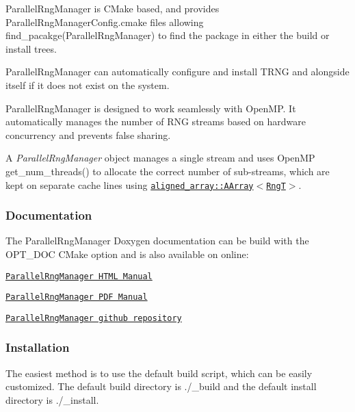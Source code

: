 \begin{DoxyItemize}
\item {\ttfamily Parallel\+Rng\+Manager} is C\+Make based, and provides {\ttfamily Parallel\+Rng\+Manager\+Config.\+cmake} files allowing {\ttfamily find\+\_\+pacakge(\+Parallel\+Rng\+Manager)} to find the package in either the build or install trees.
\item {\ttfamily Parallel\+Rng\+Manager} can automatically configure and install T\+R\+NG and alongside itself if it does not exist on the system.
\item {\ttfamily Parallel\+Rng\+Manager} is designed to work seamlessly with Open\+MP. It automatically manages the number of R\+NG streams based on hardware concurrency and prevents false sharing.
\item A {\itshape Parallel\+Rng\+Manager} object manages a single stream and uses Open\+MP {\ttfamily get\+\_\+num\+\_\+threads()} to allocate the correct number of sub-\/streams, which are kept on separate cache lines using \href{https://github.com/markjolah/AlignedArray}{\tt {\ttfamily aligned\+\_\+array\+::\+A\+Array$<$RngT$>$}}.
\end{DoxyItemize}

\subsubsection*{Documentation}

The Parallel\+Rng\+Manager Doxygen documentation can be build with the {\ttfamily O\+P\+T\+\_\+\+D\+OC} C\+Make option and is also available on online\+:
\begin{DoxyItemize}
\item \href{https://markjolah.github.io/ParallelRngManager/index.html}{\tt Parallel\+Rng\+Manager H\+T\+ML Manual}
\item \href{https://markjolah.github.io/ParallelRngManager/pdf/ParallelRngManager-0.3-reference.pdf}{\tt Parallel\+Rng\+Manager P\+DF Manual}
\item \href{https://github.com/markjolah/ParallelRngManager}{\tt Parallel\+Rng\+Manager github repository}
\end{DoxyItemize}

\subsubsection*{Installation}

The easiest method is to use the default build script, which can be easily customized. The default build directory is {\ttfamily ./\+\_\+build} and the default install directory is {\ttfamily ./\+\_\+install}. 



